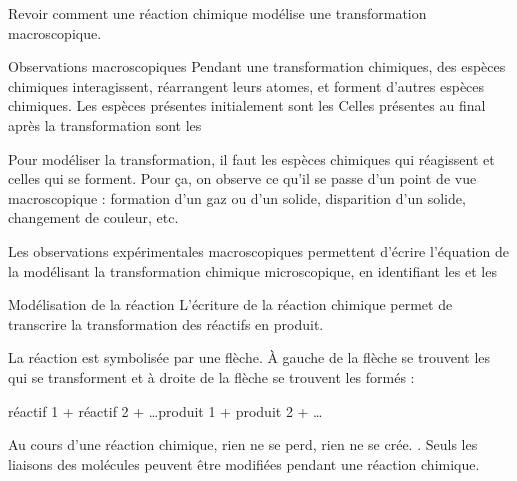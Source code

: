 \tetePremStssMeth
\vspace*{-40pt}

\begin{objectifs}
  \item Revoir comment une réaction chimique modélise une transformation macroscopique.
\end{objectifs}


\begin{doc}{Observations macroscopiques}
  Pendant une transformation chimiques, des espèces chimiques interagissent, réarrangent leurs atomes, et forment d'autres espèces chimiques.
  Les espèces présentes initialement sont les  Celles présentes au final après la transformation sont les 
  
  Pour modéliser la transformation, il faut  les espèces chimiques qui réagissent et celles qui se forment.
  Pour ça, on observe ce qu'il se passe d'un point de vue macroscopique : formation d'un gaz ou d'un solide, disparition d'un solide, changement de couleur, etc.
  
  \begin{importants}
    Les observations expérimentales macroscopiques permettent d'écrire l'équation de la  modélisant la transformation chimique microscopique, en identifiant les  et les 
  \end{importants}
\end{doc}

\begin{doc}{Modélisation de la réaction}
  L'écriture de la réaction chimique permet de transcrire la transformation des réactifs en produit.
  
  \begin{importants}
    La réaction est symbolisée par une flèche. À gauche de la flèche se trouvent les  qui se transforment et à droite de la flèche se trouvent les  formés :
    \begin{center}
      réactif 1 + réactif 2 + \ldots  \reaction produit 1 + produit 2 + \ldots
    \end{center}
  \end{importants}
  
  Au cours d'une réaction chimique, rien ne se perd, rien ne se crée. .
  Seuls les liaisons des molécules peuvent être modifiées pendant une réaction chimique.
\end{doc}

